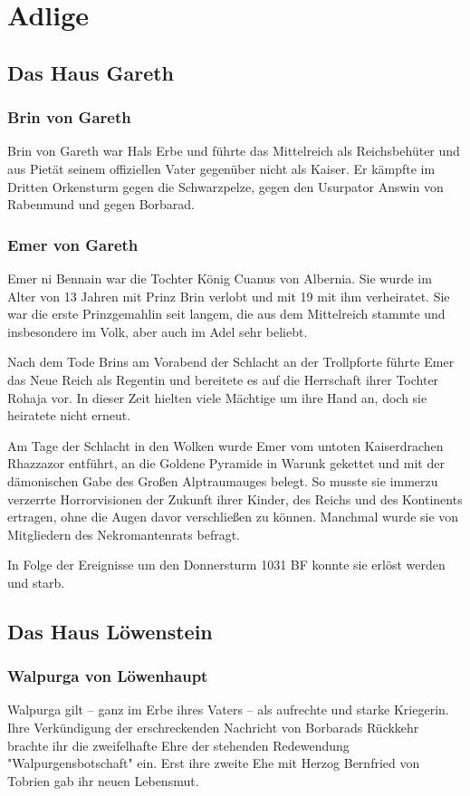 \section{Adlige}
\subsection{Das Haus Gareth}
\subsubsection{Brin von Gareth}
Brin von Gareth war Hals Erbe und führte das Mittelreich als Reichsbehüter und aus Pietät seinem offiziellen Vater gegenüber nicht als Kaiser. Er kämpfte im Dritten Orkensturm gegen die Schwarzpelze, gegen den Usurpator Answin von Rabenmund und gegen Borbarad. 

\subsubsection{Emer von Gareth}
Emer ni Bennain war die Tochter König Cuanus von Albernia. Sie wurde im Alter von 13 Jahren mit Prinz Brin verlobt und mit 19 mit ihm verheiratet. Sie war die erste Prinzgemahlin seit langem, die aus dem Mittelreich stammte und insbesondere im Volk, aber auch im Adel sehr beliebt.

Nach dem Tode Brins am Vorabend der Schlacht an der Trollpforte führte Emer das Neue Reich als Regentin und bereitete es auf die Herrschaft ihrer Tochter Rohaja vor. In dieser Zeit hielten viele Mächtige um ihre Hand an, doch sie heiratete nicht erneut.

Am Tage der Schlacht in den Wolken wurde Emer vom untoten Kaiserdrachen Rhazzazor entführt, an die Goldene Pyramide in Warunk gekettet und mit der dämonischen Gabe des Großen Alptraumauges belegt. So musste sie immerzu verzerrte Horrorvisionen der Zukunft ihrer Kinder, des Reichs und des Kontinents ertragen, ohne die Augen davor verschließen zu können. Manchmal wurde sie von Mitgliedern des Nekromantenrats befragt.

In Folge der Ereignisse um den Donnersturm 1031 BF konnte sie erlöst werden und starb. 

\subsection{Das Haus Löwenstein}
\subsubsection{Walpurga von Löwenhaupt}
Walpurga gilt – ganz im Erbe ihres Vaters – als aufrechte und starke Kriegerin. Ihre Verkündigung der erschreckenden Nachricht von Borbarads Rückkehr brachte ihr die zweifelhafte Ehre der stehenden Redewendung "Walpurgensbotschaft" ein. Erst ihre zweite Ehe mit Herzog Bernfried von Tobrien gab ihr neuen Lebensmut. 

